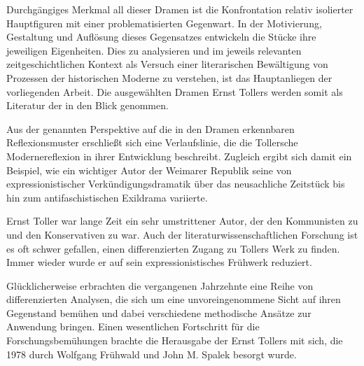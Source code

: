 Durchgängiges Merkmal all dieser Dramen ist die Konfrontation relativ
isolierter Hauptfiguren mit einer problematisierten Gegenwart. In der
Motivierung, Gestaltung und Auflösung dieses Gegensatzes entwickeln die
Stücke ihre jeweiligen Eigenheiten. Dies zu analysieren und im jeweils
relevanten zeitgeschichtlichen Kontext als Versuch einer literarischen
Bewältigung von Prozessen der historischen Moderne zu verstehen, ist das
Hauptanliegen der vorliegenden Arbeit. Die ausgewählten Dramen Ernst Tollers
werden somit als Literatur der  in den Blick
genommen.

Aus der genannten Perspektive auf die in den Dramen erkennbaren Reflexionsmuster  
erschließt sich eine Verlaufslinie, die die Tollersche Modernereflexion in
ihrer Entwicklung beschreibt. Zugleich ergibt sich damit ein Beispiel, wie 
ein wichtiger Autor der Weimarer Republik seine \Cite{Bewältigung des
  Wirklichen}   
von expressionistischer Verkündigungsdramatik über das neusachliche Zeitstück
bis hin zum antifaschistischen Exildrama variierte. 


Ernst Toller war lange Zeit ein sehr umstrittener Autor, der den Kommunisten
zu \Cite{bürgerlich} und den Konservativen zu \Cite{sozialistisch} war. Auch der
literaturwissenschaftlichen Forschung ist es oft schwer gefallen, einen
differenzierten Zugang zu Tollers Werk zu finden. Immer wieder wurde er
 auf sein expressionistisches Frühwerk reduziert.  

Glücklicherweise erbrachten die vergangenen Jahrzehnte eine Reihe von
differenzierten Analysen, die sich um eine unvoreingenommene Sicht auf ihren
Gegenstand bemühen und dabei verschiedene methodische Ansätze zur Anwendung
bringen.
Einen wesentlichen Fortschritt für die Forschungsbemühungen
brachte die Herausgabe der  Ernst Tollers
mit sich, die 1978 durch Wolfgang Frühwald und John M. Spalek
besorgt wurde.

